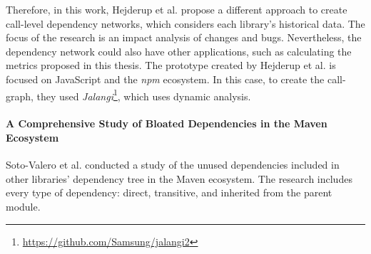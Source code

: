 Therefore, in this work, Hejderup et al. propose a different approach to create call-level dependency networks, which considers each library's historical data. The focus of the research is an impact analysis of changes and bugs. Nevertheless, the dependency network could also have other applications, such as calculating the metrics proposed in this thesis. The prototype created by Hejderup et al. is focused on JavaScript and the \textit{npm} ecosystem. In this case, to create the call-graph, they used \textit{Jalangi}\footnote{\href{https://github.com/Samsung/jalangi2}{https://github.com/Samsung/jalangi2}}, which uses dynamic analysis.

\begin{comment}
\paragraph{Vulnerable Open Source Dependencies: Counting Those That Matter \cite{pashchenko2018vulnerable}} %
In this research, Pashchenko et al. propose a new method to count the dependencies of libraries. This method is used to analyze the dependencies of 200 libraries of the Maven ecosystem. With their method, they differentiate between libraries from the same project and third-party libraries. Furthermore, the dependencies that are not deployed in production (only used for testing or development purposes) are filtered out since these dependencies' vulnerabilities do not affect the final product. Furthermore, they consider the special case of halted dependencies, which are the ones that are not being actively developed. Vulnerabilities in halted dependencies suppose an important threat to the software projects that depend on these since the vulnerability will not be fixed.

One of the main contributions of this research is implementing the method defined in the paper to detect the vulnerabilities that matter according to their definition.

However, Pashchenko et al. do not perform a call-level analysis of the dependencies since their dependency resolution is based only on the \textit{POM} file of the libraries. Hence, the transitive dependencies that are not really used in the studied library are still counted.
\end{comment}

\paragraph{A Comprehensive Study of Bloated Dependencies in the Maven Ecosystem \cite{soto2020comprehensive}}
Soto-Valero et al. conducted a study of the unused dependencies included in other libraries' dependency tree in the Maven ecosystem. The research includes every type of dependency: direct, transitive, and inherited from the parent module.

